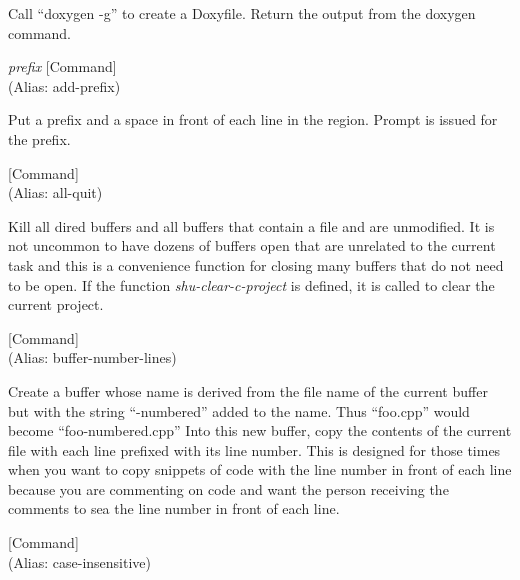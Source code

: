 \begin{doc-string}
Call ``doxygen -g'' to create a Doxyfile.  Return the output from the doxygen command.
\end{doc-string}

\vspace{1em}
\noindent
{}
\usebox{\funcname}\emph{prefix}
 \hfill [Command]\\%
 (Alias: add-prefix)

\begin{doc-string}
Put a prefix and a space in front of each line in the region.  Prompt is issued
for the prefix.
\end{doc-string}

\vspace{1em}
\noindent
{}
\usebox{\funcname}
 \hfill [Command]\\%
 (Alias: all-quit)

\begin{doc-string}
Kill all dired buffers and all buffers that contain a file and are unmodified.
It is not uncommon to have dozens of buffers open that are unrelated to the current task
and this is a convenience function for closing many buffers that do not need to
be open.
If the function \emph{shu-clear-c-project} is defined, it is called to clear the current
project.
\end{doc-string}

\vspace{1em}
\noindent
{}
\usebox{\funcname}
 \hfill [Command]\\%
 (Alias: buffer-number-lines)

\begin{doc-string}
Create a buffer whose name is derived from the file name of the current
buffer but with the string ``-numbered'' added to the name.  Thus ``foo.cpp''
would become ``foo-numbered.cpp'' Into this new buffer, copy the contents of the
current file with each line prefixed with its line number.  This is designed for
those times when you want to copy snippets of code with the line number in front
of each line because you are commenting on code and want the person receiving
the comments to sea the line number in front of each line.
\end{doc-string}

\vspace{1em}
\noindent
{}
\usebox{\funcname}
 \hfill [Command]\\%
 (Alias: case-insensitive)

